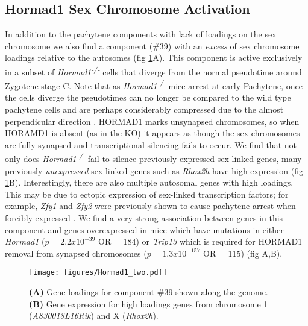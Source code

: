 \subsection{Hormad1 Sex Chromosome Activation}
In addition to the pachytene components with lack of loadings on the sex chromosome we also find a component (\#39) with an \textit{excess} of sex chromosome loadings relative to the autosomes (fig \ref{fig:Hormad1}A). This component is active exclusively in a subset of \textit{Hormad1\textsuperscript{-/-}} cells that diverge from the normal pseudotime around Zygotene stage \label{fig:MiscComponents}C. Note that as \textit{Hormad1\textsuperscript{-/-}} mice arrest at early Pachytene, once the cells diverge the pseudotimes can no longer be compared to the wild type pachytene cells and are perhaps considerably compressed due to the almost perpendicular direction \parencite{Shin2010Hormad1}. HORMAD1 marks unsynapsed chromosomes, so when HORAMD1 is absent (as in the KO) it appears as though the sex chromosomes are fully synapsed and transcriptional silencing fails to occur. We find that not only does \textit{Hormad1\textsuperscript{-/-}} fail to silence previously expressed sex-linked genes, many previously \textit{unexpressed} sex-linked genes such as \textit{Rhox2h} have high expression (fig \ref{fig:Hormad1}B). Interestingly, there are also multiple autosomal genes with high loadings. This may be due to ectopic expression of sex-linked transcription factors; for example, \textit{Zfy1} and \textit{Zfy2} were previously shown to cause pachytene arrest when forcibly expressed \cite{Royo2010Evidence}. We find a very strong association between genes in this component and genes overexpressed in mice which have mutations in either \textit{Hormad1} ($p = 2.2x10^{-39}$ OR = 184) or \textit{Trip13} which is required for HORMAD1 removal from synapsed chromosomes ($p = 1.3x10^{-157}$ OR = 115) \cite{Ortega2016Surveillance, Wojtasz2009Mouse} (fig \label{fig:MiscComponents}A,B).

\begin{figure}[H]
	\centering
	\texttt{[image: figures/Hormad1\_two.pdf]}
	\caption{
		\textbf{(A)} Gene loadings for component \#39 shown along the genome.
		\textbf{(B)} Gene expression for high loadings genes from chromosome 1 (\textit{A830018L16Rik}) and X (\textit{Rhox2h}).
	}
	\label{fig:Hormad1}
\end{figure}


